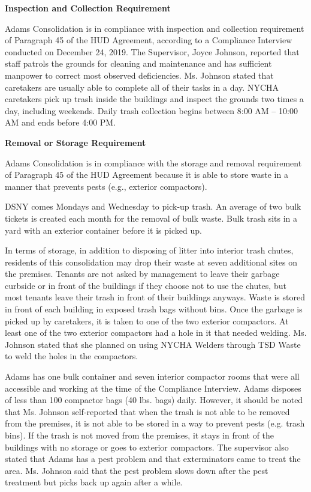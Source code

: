 
\textbf{Inspection and Collection Requirement}

Adams Consolidation is in compliance with inspection and collection requirement of Paragraph 45 of the HUD Agreement, according to a Compliance Interview conducted on December 24, 2019. The Supervisor, Joyce Johnson, reported that staff patrols the grounds for cleaning and maintenance and has sufficient manpower to correct most observed deficiencies. Ms. Johnson stated that caretakers are usually able to complete all of their tasks in a day. NYCHA caretakers pick up trash inside the buildings and inspect the grounds two times a day, including weekends. Daily trash collection begins between 8:00 AM -- 10:00 AM and ends before 4:00 PM. 

\textbf{Removal or Storage Requirement}

Adams Consolidation is in compliance with the storage and removal requirement of Paragraph 45 of the HUD Agreement because it is able to store waste in a manner that prevents pests (e.g., exterior compactors).

DSNY comes Mondays and Wednesday to pick-up trash. An average of two bulk tickets is created each month for the removal of bulk waste. Bulk trash sits in a yard with an exterior container before it is picked up. 

In terms of storage, in addition to disposing of litter into interior trash chutes, residents of this consolidation may drop their waste at seven additional sites on the premises. Tenants are not asked by management to leave their garbage curbside or in front of the buildings if they choose not to use the chutes, but most tenants leave their trash in front of their buildings anyways. Waste is stored in front of each building in exposed trash bags without bins. Once the garbage is picked up by caretakers, it is taken to one of the two exterior compactors. At least one of the two exterior compactors had a hole in it that needed welding. Ms. Johnson stated that she planned on using NYCHA Welders through TSD Waste to weld the holes in the compactors.

Adams has one bulk container and seven interior compactor rooms that were all accessible and working at the time of the Compliance Interview. Adams disposes of less than 100 compactor bags (40 lbs. bags) daily. However, it should be noted that Ms. Johnson self-reported that when the trash is not able to be removed from the premises, it is not able to be stored in a way to prevent pests (e.g. trash bins). If the trash is not moved from the premises, it stays in front of the buildings with no storage or goes to exterior compactors. The supervisor also stated that Adams has a pest problem and that exterminators came to treat the area. Ms. Johnson said that the pest problem slows down after the pest treatment but picks back up again after a while.

